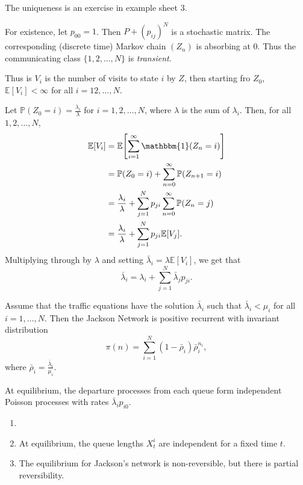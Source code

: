 \documentclass[12pt]{article}
\begin{document}
\begin{proofbox}
	The uniqueness is an exercise in example sheet 3.

	For existence, let $p_{00} = 1$. Then $P + (p_{ij})^{N}$ is a stochastic matrix. The corresponding (discrete time) Markov chain $(Z_n)$ is absorbing at $0$. Thus the communicating class $\{1, 2, \ldots, N\}$ is \emph{transient}.

	Thus is $V_i$ is the number of visits to state $i$ by $Z$, then starting fro $Z_0$, $\mathbb{E}[V_i] < \infty$ for all $i = 1 2, \ldots, N$.

	Let $\mathbb{P}(Z_0 = i) = \frac{\lambda_i}{\lambda}$ for $i = 1, 2, \ldots, N$, where $\lambda$ is the sum of $\lambda_i$. Then, for all $1, 2, \ldots, N$,
	\begin{align*}
		\mathbb{E}[V_i] &= \mathbb{E}\Biggl[ \sum_{i = 1}^{\infty}\mathbbm{1}(Z_n = i) \Biggr] \\
				&= \mathbb{P}(Z_0 = i) + \sum_{n = 0}^{\infty}\mathbb{P}(Z_{n+1} = i) \\
				&= \frac{\lambda_i}{\lambda} + \sum_{j = 1}^{N}p_{ji} \sum_{n = 0}^{\infty} \mathbb{P}(Z_n = j) \\
				&= \frac{\lambda_i}{\lambda} + \sum_{j = 1}^{N} p_{ji} \mathbb{E}[V_j].
	\end{align*}
	Multiplying through by $\lambda$ and setting $\bar \lambda_i = \lambda \mathbb{E}[V_i]$, we get that
	\[
	\bar \lambda_i = \lambda_i + \sum_{j = 1}^{N} \bar \lambda_j p_{ji}.
	\]
\end{proofbox}

\begin{theorem}
	Assume that the traffic equations have the solution $\bar \lambda_i$ such that $\bar \lambda_i < \mu_i$ for all $i = 1, \ldots, N$. Then the Jackson Network is positive recurrent with invariant distribution
	\[
	\pi(n) = \sum_{i = 1}^{N} (1 - \bar \rho_i) \bar \rho_i^{n_i},
	\]
	where $\bar \rho_i = \frac{\bar \lambda_i}{\mu_i}$.

	At equilibrium, the departure processes from each queue form independent Poisson processes with rates $\bar \lambda_i p_{i0}$.
\end{theorem}

\begin{remark}
	\begin{enumerate}
		\item[]
		\item At equilibrium, the queue lengths $X_t^{i}$ are independent for a fixed time $t$.
		\item The equilibrium for Jackson's network is non-reversible, but there is partial reversibility.
	\end{enumerate}
\end{remark}
\end{document}
